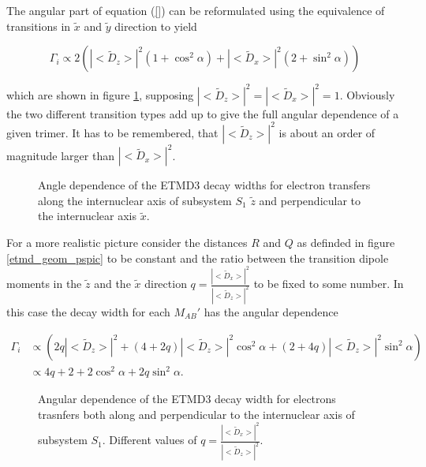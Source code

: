 The angular part of equation (\ref{}) can be reformulated using
the equivalence of transitions in $\tilde{x}$ and $\tilde{y}$ direction to
yield

\begin{equation}
  \Gamma_i \propto 2 \left( |<\tilde{D}_{z}>|^2 (1+\cos^2\alpha)
                           + |<\tilde{D}_x>|^2 (2+ \sin^2\alpha) \right)
\end{equation}

which are shown in figure \ref{figure:etmd_angle_dir}, supposing
$|<\tilde{D}_{z}>|^2 = |<\tilde{D}_x>|^2 = 1$.
Obviously the two different transition types add up to give the full
angular dependence of a given trimer. It has to be remembered, that
$|<\tilde{D}_{z}>|^2$ is about an order of magnitude larger than
$|<\tilde{D}_{x}>|^2$.

\begin{figure}[th]
 \centering
 
 \caption{Angle dependence of the ETMD3 decay widths for electron transfers
          along the internuclear axis of subsystem $S_1$ $\tilde{z}$ and perpendicular
          to the internuclear axis $\tilde{x}$.}
 \label{figure:etmd_angle_dir}
\end{figure}

For a more realistic picture
consider the distances $R$ and $Q$ as definded in figure \ref{etmd_geom_pspic}
to be constant and the ratio between the transition dipole moments
in the $\tilde{z}$ and the $\tilde{x}$ direction
$q=\frac{|<\tilde{D}_x>|^2}{|<\tilde{D}_z>|^2}$ to be fixed to some number.
In this case the decay width for each $M_{AB}'$ has the angular dependence

\begin{align}
 \Gamma_i &\propto \left( 2q |<\tilde{D}_{z}>|^2 +
                  (4+2q)|<\tilde{D}_{z}>|^2 \cos^2\alpha +
                  (2+4q)|<\tilde{D}_{z}>|^2 \sin^2\alpha \right) \\
          &\propto 4q + 2 + 2 \cos^2\alpha + 2q \sin^2\alpha .
\end{align}

\begin{figure}[h]
 \centering
 
 \caption{Angular dependence of the \ac{ETMD}3 decay width for electrons trasnfers
          both along and perpendicular to the internuclear axis of subsystem $S_1$.
          Different values of $q=\frac{|<\tilde{D}_x>|^2}{|<\tilde{D}_z>|^2}$.}
 \label{figure:etmd_angle}
\end{figure}



